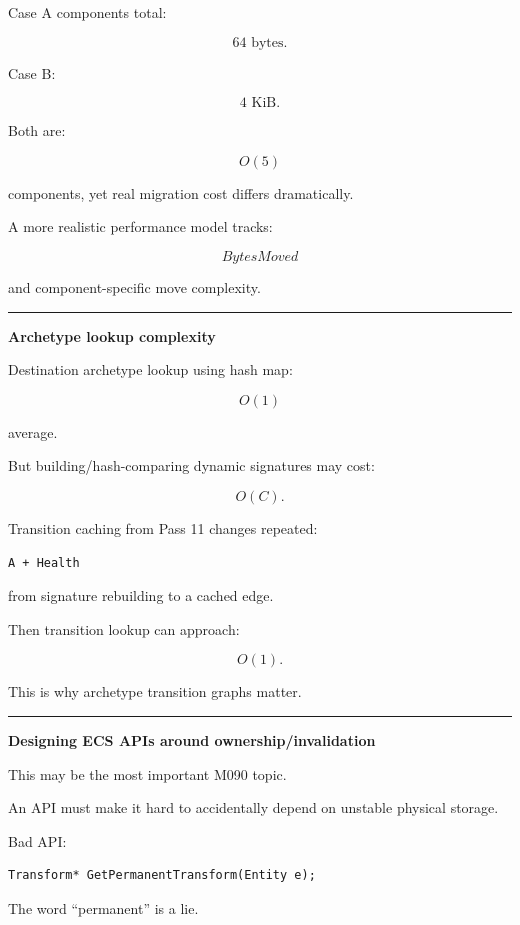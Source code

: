 Case A components total:

\[
64\text{ bytes}.
\]

Case B:

\[
4\text{ KiB}.
\]

Both are:

\[
O(5)
\]

components, yet real migration cost differs dramatically.

A more realistic performance model tracks:

\[
BytesMoved
\]

and component-specific move complexity.

\begin{center}\rule{0.5\linewidth}{0.5pt}\end{center}

\textbf{Archetype lookup complexity}

Destination archetype lookup using hash map:

\[
O(1)
\]

average.

But building/hash-comparing dynamic signatures may cost:

\[
O(C).
\]

Transition caching from Pass 11 changes repeated:

\begin{verbatim}
A + Health
\end{verbatim}

from signature rebuilding to a cached edge.

Then transition lookup can approach:

\[
O(1).
\]

This is why archetype transition graphs matter.

\begin{center}\rule{0.5\linewidth}{0.5pt}\end{center}

\textbf{Designing ECS APIs around ownership/invalidation}

This may be the most important M090 topic.

An API must make it hard to accidentally depend on unstable physical storage.

Bad API:

\begin{verbatim}
Transform* GetPermanentTransform(Entity e);
\end{verbatim}

The word ``permanent'' is a lie.

